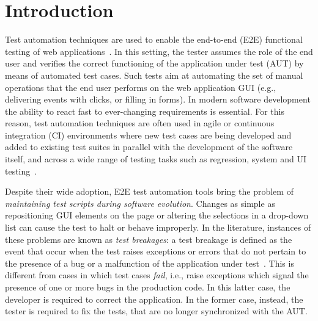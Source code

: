 \section{Introduction}\label{sec:introduction}

Test automation techniques are used to enable the end-to-end (E2E) functional testing of web applications~\cite{DBLP:journals/ac/TonellaRM14}. 
In this setting, the tester assumes the role of the end user and verifies the correct functioning of the application under test (AUT) by means of automated test cases. Such tests aim at automating the set of manual operations that the end user  performs on the web application GUI (e.g., delivering events with clicks, or filling in forms). 
In modern software development the ability to react fast to ever-changing requirements is essential. For this reason, test automation techniques are often used in agile or continuous integration (CI) environments where new test cases are being developed and added to existing test suites in parallel with the development of the software itself, and across a wide range of testing tasks such as regression, system and UI testing~\cite{STVR:STVR121,Fewster,Ramler:2006:EPT:1138929.1138946,Nguyen2014,7381848}.


Despite their wide adoption, E2E test automation tools bring the problem of \textit{maintaining test scripts during software evolution}. Changes as simple as repositioning GUI elements on the page or altering the selections in a drop-down list can cause the test to halt or behave improperly. 
In the literature, instances of these problems are known as \textit{test breakages}: a test breakage is defined as the event that occur when the test raises exceptions or errors that do not pertain to the presence of a bug or a malfunction of the application under test~\cite{Daniel:2011:AGR:2002931.2002937,Daniel:2009:RSR:1747491.1747538,Daniel:2010:TRU:1831708.1831734,Hammoudi-2016-ICST}. 
This is different from cases in which test cases \textit{fail}, i.e., raise exceptions which signal the presence of one or more bugs in the production code. In this latter case, the developer is required to correct the application. In the former case, instead, the tester is required to fix the tests, that are no longer synchronized with the AUT.


